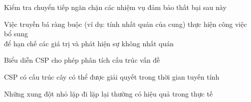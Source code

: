 \documentclass{article}
\begin{document}
\begin{huge}
Kiểm tra chuyển tiếp ngăn chặn các nhiệm vụ đảm bảo thất bại sau này

Việc truyền bá ràng buộc (ví dụ: tính nhất quán của cung) thực hiện công việc bổ sung\\
để hạn chế các giá trị và phát hiện sự không nhất quán

Biểu diễn CSP cho phép phân tích cấu trúc vấn đề

CSP có cấu trúc cây có thể được giải quyết trong thời gian tuyến tính

Những xung đột nhỏ lặp đi lặp lại thường có hiệu quả trong thực tế







\end{huge}
\end{document}
